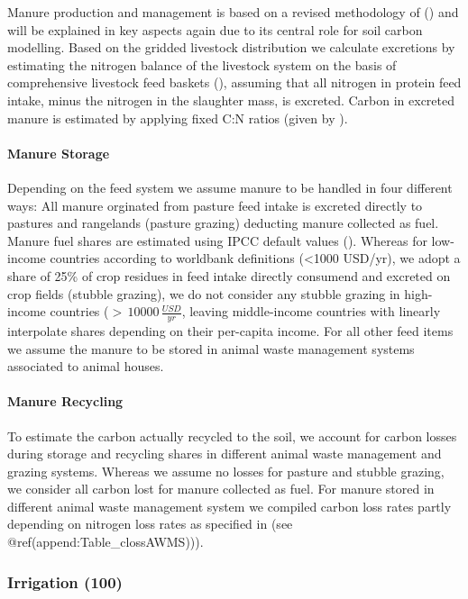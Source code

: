 \documentclass[gc, manuscript]{copernicus}
\begin{document}
Manure production and management is based on a revised methodology of
(\citep{bodirsky2012}) and will be explained in key aspects again due to
its central role for soil carbon modelling. Based on the gridded
livestock distribution we calculate excretions by estimating the
nitrogen balance of the livestock system on the basis of comprehensive
livestock feed baskets (\citep{weindl}), assuming that all nitrogen in
protein feed intake, minus the nitrogen in the slaughter mass, is
excreted. Carbon in excreted manure is estimated by applying fixed C:N
ratios (given by \citep[(][]{ipcc_2019_2019}).

\paragraph{Manure Storage}

Depending on the feed system we assume manure to be handled in four
different ways: All manure orginated from pasture feed intake is
excreted directly to pastures and rangelands (pasture grazing) deducting
manure collected as fuel. Manure fuel shares are estimated using IPCC
default values (\citet{ippc_2006_2006}). Whereas for low-income
countries according to worldbank definitions (\textless1000 USD/yr), we
adopt a share of 25\% of crop residues in feed intake directly consumend
and excreted on crop fields (stubble grazing), we do not consider any
stubble grazing in high-income countries (\(>\,10000\,\tfrac{USD}{yr}\),
leaving middle-income countries with linearly interpolate shares
depending on their per-capita income. For all other feed items we assume
the manure to be stored in animal waste management systems associated to
animal houses.

\paragraph{Manure Recycling}

To estimate the carbon actually recycled to the soil, we account for
carbon losses during storage and recycling shares in different animal
waste management and grazing systems. Whereas we assume no losses for
pasture and stubble grazing, we consider all carbon lost for manure
collected as fuel. For manure stored in different animal waste
management system we compiled carbon loss rates partly depending on
nitrogen loss rates as specified in \citep{bodirsky2012} (see
@ref(append:Table\_clossAWMS))).

\subsubsection{Irrigation (100)}
\end{document}
